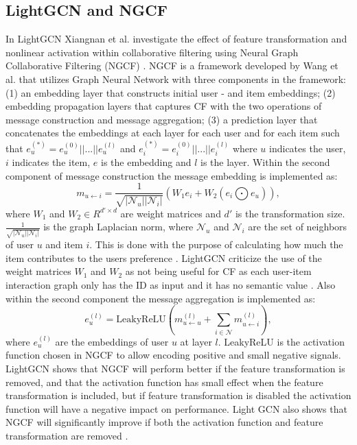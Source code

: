 \subsection{LightGCN and NGCF}
In LightGCN Xiangnan et al. investigate the effect of feature transformation and nonlinear activation within collaborative filtering using Neural Graph Collaborative Filtering (NGCF) \cite{lightgcn}.
NGCF is a framework developed by Wang et al. \cite{NGCF_2019} that utilizes Graph Neural Network with three components in the framework: (1) an embedding layer that constructs initial user - and item embeddings; (2) embedding propagation layers that captures CF with the two operations of message construction and message aggregation; (3) a prediction layer that concatenates the embeddings at each layer for each user and for each item such that $e_{u}^{(*)} = e_{u}^{(0)}||...||e_{u}^{(l)}$ and $e_{i}^{(*)} = e_{i}^{(0)}||...||e_{i}^{(l)}$ where $u$ indicates the user, $i$ indicates the item, $e$ is the embedding and $l$ is the layer.
Within the second component of message construction the message embedding is implemented as:
\begin{equation}
    m_{u \leftarrow i} = \frac{1}{\sqrt{|\mathcal{N}_u||\mathcal{N}_i|}}(W_1e_i + W_2(e_i \bigodot e_u)),
    \label{eq:message-construction}
\end{equation}
where $W_1$ and $W_2 \in R^{d' \times d}$ are weight matrices and $d'$ is the transformation size.
$\frac{1}{\sqrt{|\mathcal{N}_u||\mathcal{N}_i|}}$ is the graph Laplacian norm, where $\mathcal{N}_u$ and $\mathcal{N}_i$ are the set of neighbors of user $u$ and item $i$.
This is done with the purpose of calculating how much the item contributes to the users preference \cite{NGCF_2019}.
LightGCN criticize the use of the weight matrices $W_1$ and $W_2$ as not being useful for CF as each user-item interaction graph only has the ID as input and it has no semantic value \cite{lightgcn}.
Also within the second component the message aggregation is implemented as:
\begin{equation}
    e_{u}^{(l)} = \mbox{LeakyReLU}(m^{(l)}_{u \leftarrow u} + \sum^{}_{i \in \mathcal{N}} m^{(l)}_{u \leftarrow i}),
\end{equation}
where $e_{u}^{(l)}$ are the embeddings of user $u$ at layer $l$.
LeakyReLU is the activation function chosen in NGCF to allow encoding positive and small negative signals.
LightGCN shows that NGCF will perform better if the feature transformation is removed, and that the activation function has small effect when the feature transformation is included, but if feature transformation is disabled the activation function will have a negative impact on performance.
Light GCN also shows that NGCF will significantly improve if both the activation function and feature transformation are removed \cite{lightgcn}.
